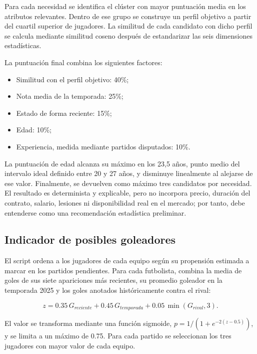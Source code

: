 Para cada necesidad se identifica el clúster con mayor puntuación media en los atributos relevantes. Dentro de ese grupo se construye un perfil objetivo a partir del cuartil superior de jugadores. La similitud de cada candidato con dicho perfil se calcula mediante similitud coseno después de estandarizar las seis dimensiones estadísticas.

La puntuación final combina los siguientes factores:

\begin{itemize}
    \item Similitud con el perfil objetivo: 40\%;
    \item Nota media de la temporada: 25\%;
    \item Estado de forma reciente: 15\%;
    \item Edad: 10\%;
    \item Experiencia, medida mediante partidos disputados: 10\%.
\end{itemize}

La puntuación de edad alcanza su máximo en los 23,5 años, punto medio del intervalo ideal definido entre 20 y 27 años, y disminuye linealmente al alejarse de ese valor. Finalmente, se devuelven como máximo tres candidatos por necesidad. El resultado es determinista y explicable, pero no incorpora precio, duración del contrato, salario, lesiones ni disponibilidad real en el mercado; por tanto, debe entenderse como una recomendación estadística preliminar.

\subsection{Indicador de posibles goleadores}

El script  ordena a los jugadores de cada equipo según su propensión estimada a marcar en los partidos pendientes. Para cada futbolista, combina la media de goles de sus siete apariciones más recientes, su promedio goleador en la temporada 2025 y los goles anotados históricamente contra el rival:

\begin{equation}
    z=0.35\,G_{reciente}+0.45\,G_{temporada}+0.05\,\min(G_{rival},3).
\end{equation}

El valor se transforma mediante una función sigmoide, $p=1/(1+e^{-2(z-0.5)})$, y se limita a un máximo de 0.75. Para cada partido se seleccionan los tres jugadores con mayor valor de cada equipo.

